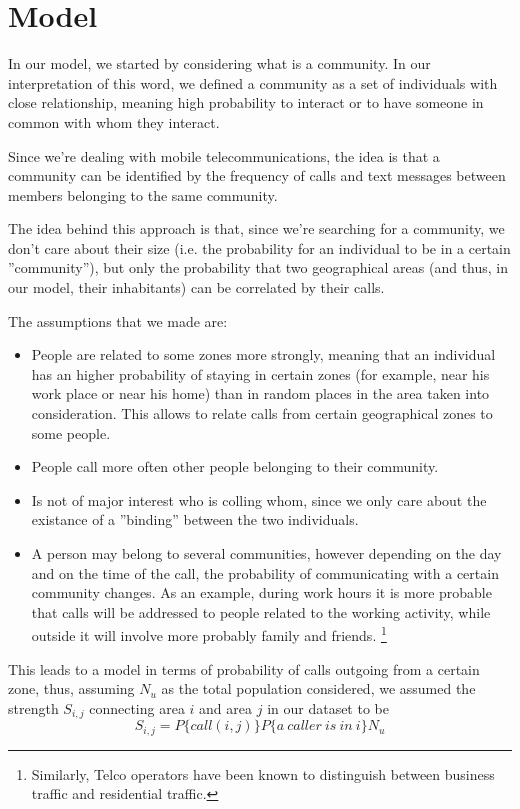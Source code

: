 \section{Model}
In our model, we started by considering what is a community. In our interpretation of this word,
we defined a community as a set of individuals with close relationship, meaning high probability to interact or to have someone in common with whom they interact.

Since we're dealing with mobile telecommunications, the idea is that a community can be identified by the frequency of calls and text messages between members belonging
to the same community.

The idea behind this approach is that, since we're searching for a community, we don't care about their size (i.e. the probability for an individual to be in a certain ''community''), 
but only the probability that two geographical areas (and thus, in our model, their inhabitants) can be correlated by their calls.

The assumptions that we made are:
\begin{itemize}
\item People are related to some zones more strongly, meaning that an individual 
has an higher probability of staying in certain zones (for example, near his work place or near his home) than in random places
in the area taken into consideration. This allows to relate calls from certain geographical zones to some people.
\item People call more often other people belonging to their community.
\item Is not of major interest who is colling whom, since we only care about the existance of a ''binding'' between the two individuals.
\item A person may belong to several communities, however depending on the day and on the time of the call, the probability of communicating with a certain community changes.
As an example, during work hours it is more probable that calls will be addressed to people related to the working activity, while outside it will involve more probably family and friends.
\footnote{Similarly, Telco operators have been known to distinguish between business traffic and residential traffic.} 
\end{itemize}

This leads to a model in terms of probability of calls outgoing from a certain zone, thus, assuming $N_{u}$ as the total population considered, we assumed the strength $S_{i,j}$ connecting
area $i$ and area $j$ in our dataset to be
$$
S_{i,j}  = P\{call(i,j)\} P\{a\ caller\ is\ in\ i\} N_{u}
$$

